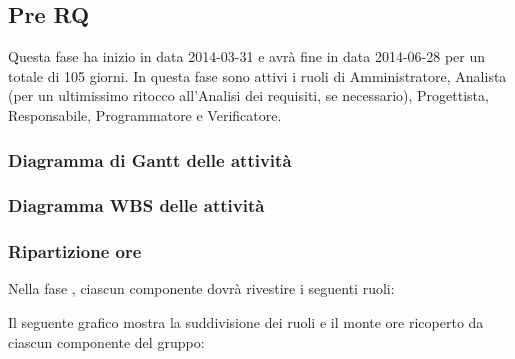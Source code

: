 \subsection{Pre RQ}
Questa fase ha inizio in data 2014-03-31 e avrà fine in data 2014-06-28 per un totale di 105 giorni. In questa fase sono attivi i ruoli di Amministratore, Analista (per un ultimissimo ritocco all'Analisi dei requisiti, se necessario), Progettista, Responsabile, Programmatore e Verificatore.

\subsubsection{Diagramma di Gantt delle attività}

\newpage
\subsubsection{Diagramma WBS delle attività}

\newpage
\subsubsection{Ripartizione ore}

\newpage
Nella fase , ciascun componente dovrà rivestire i seguenti ruoli:

Il seguente grafico mostra la suddivisione dei ruoli e il monte ore ricoperto da ciascun componente del gruppo:
